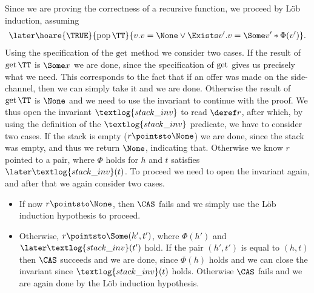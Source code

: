 Since we are proving the correctness of a recursive function, we proceed by L\"ob induction, assuming
\begin{align*}
  \later\hoare{\TRUE}{\popS\TT}{v.v = \None \lor{} \Exists v' . v = \Some v' \ast \Phi(v')}.
\end{align*}
Using the specification of the $\operatorname{get}$ method we consider two cases.
If the result of $\mbget\TT$ is $\Some x$ we are done, since the specification of $\operatorname{get}$ gives us precisely what we need.
This corresponds to the fact that if an offer was made on the side-channel, then we can simply take it and we are done.
Otherwise the result of $\mbget\TT$ is $\None$ and we need to use the invariant to continue with the proof.
We thus open the invariant $\textlog{stack\_inv}$ to read $\deref r$, after which, by using the definition of the $\textlog{stack\_inv}$ predicate, we have to consider two cases.
If the stack is empty ($r \pointsto \None$) we are done, since the stack was empty, and thus we return $\None$, indicating that.
Otherwise we know $r$ pointed to a pair, where $\Phi$ holds for $h$ and $t$ satisfies $\later \textlog{stack\_inv}(t)$.
To proceed we need to open the invariant again, and after that we again consider two cases.
\begin{itemize}
\item If now $r \pointsto \None$, then $\CAS$ fails and we simply use the L\"ob induction hypothesis to proceed.
\item Otherwise, $r \pointsto \Some (h', t')$, where $\Phi(h')$ and $\later\textlog{stack\_inv}(t')$ hold.
  If the pair $(h', t')$ is equal to $(h, t)$ then $\CAS$ succeeds and we are done, since $\Phi(h)$ holds and we can close the invariant since $\textlog{stack\_inv}(t)$ holds.
  Otherwise $\CAS$ fails and we are again done by the L\"ob induction hypothesis.
\end{itemize}

